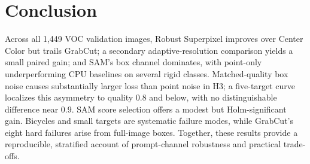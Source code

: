 \section{Conclusion}

Across all 1,449 VOC validation images, Robust Superpixel improves over Center Color but trails GrabCut; a secondary adaptive-resolution comparison yields a small paired gain; and SAM's box channel dominates, with point-only underperforming CPU baselines on several rigid classes. Matched-quality box noise causes substantially larger loss than point noise in H3; a five-target curve localizes this asymmetry to quality 0.8 and below, with no distinguishable difference near 0.9. SAM score selection offers a modest but Holm-significant gain. Bicycles and small targets are systematic failure modes, while GrabCut's eight hard failures arise from full-image boxes. Together, these results provide a reproducible, stratified account of prompt-channel robustness and practical trade-offs.

